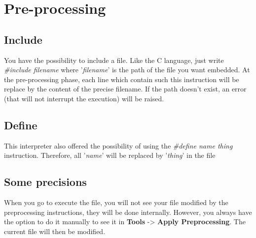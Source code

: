 \section{Pre-processing}
\subsection{Include}
You have the possibility to include a file. Like the C language, just
write \textit{\#include filename} where '\textit{filename}' is the path of the file you want embedded.
At the pre-processing phase, each line which contain such this instruction will be replace by the content of the precise filename. If the path doesn't exist, an error
(that will not interrupt the execution) will be raised.

\subsection{Define}
This interpreter also offered the possibility of using the \textit{\#define name thing} instruction. Therefore, all '\textit{name}' will be replaced by '\textit{thing}' in the file

\subsection{Some precisions}
When you go to execute the file, you will not see your file modified by the preprocessing instructions, they will be done internally. However, you always have the option to do it manually to see it in \textbf{Tools} -> \textbf{Apply Preprocessing}. The current file will then be modified.
